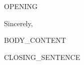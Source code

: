 \documentclass[11pt,letterpaper,sans]{moderncv}
\begin{document}
\date{\today}
\opening{{{OPENING}}}
\closing{Sincerely,}

\makelettertitle

{{BODY_CONTENT}}

{{CLOSING_SENTENCE}}

\makeletterclosing
\end{document}
